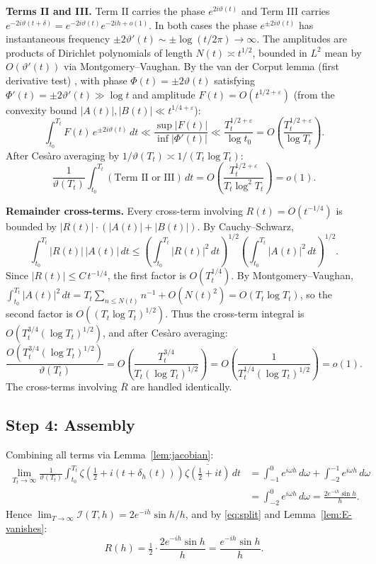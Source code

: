 \documentclass{amsart}
\begin{document}
\medskip
\noindent\textbf{Terms II and III.}\enspace
Term II carries the phase $e^{2i\vartheta(t)}$ and Term III carries
$e^{-2i\vartheta(t+\delta)} = e^{-2i\vartheta(t)}e^{-2ih+o(1)}$.
In both cases the phase $e^{\pm 2i\vartheta(t)}$ has instantaneous frequency
$\pm 2\vartheta'(t) \sim \pm\log(t/2\pi) \to \infty$.
The amplitudes are products of Dirichlet polynomials of length $N(t) \asymp t^{1/2}$,
bounded in $L^2$ mean by $O(\vartheta'(t))$ via Montgomery--Vaughan.
By the van der Corput lemma (first derivative test) \cite{Titchmarsh1986},
with phase $\Phi(t) = \pm 2\vartheta(t)$ satisfying $\Phi'(t) = \pm 2\vartheta'(t)
\gg \log t$ and amplitude $F(t) = O(t^{1/2+\varepsilon})$ (from the convexity
bound $|A(t)|, |B(t)| \ll t^{1/4+\varepsilon}$):
\[
  \int_{t_0}^{T_t} F(t)\,e^{\pm 2i\vartheta(t)}\,dt
  \ll \frac{\sup|F(t)|}{\inf|\Phi'(t)|}
  \ll \frac{T_t^{1/2+\varepsilon}}{\log t_0} = O\!\left(\frac{T_t^{1/2+\varepsilon}}{\log T_t}\right).
\]
After Ces\`aro averaging by $1/\vartheta(T_t) \asymp 1/(T_t\log T_t)$:
\[
  \frac{1}{\vartheta(T_t)}\int_{t_0}^{T_t}(\text{Term II or III})\,dt
  = O\!\left(\frac{T_t^{1/2+\varepsilon}}{T_t\log^2 T_t}\right) = o(1).
\]

\medskip
\noindent\textbf{Remainder cross-terms.}\enspace
Every cross-term involving $R(t) = O(t^{-1/4})$ is bounded by
$|R(t)|\cdot(|A(t)|+|B(t)|)$. By Cauchy--Schwarz,
\[
  \int_{t_0}^{T_t}|R(t)|\,|A(t)|\,dt
  \le \left(\int_{t_0}^{T_t}|R(t)|^2\,dt\right)^{1/2}
      \left(\int_{t_0}^{T_t}|A(t)|^2\,dt\right)^{1/2}.
\]
Since $|R(t)| \le C\,t^{-1/4}$, the first factor is $O(T_t^{1/4})$.
By Montgomery--Vaughan, $\int_{t_0}^{T_t}|A(t)|^2\,dt = T_t\sum_{n\le N(t)}n^{-1}
+ O(N(t)^2) = O(T_t\log T_t)$, so the second factor is $O((T_t\log T_t)^{1/2})$.
Thus the cross-term integral is $O(T_t^{3/4}(\log T_t)^{1/2})$, and after
Ces\`aro averaging:
\[
  \frac{O(T_t^{3/4}(\log T_t)^{1/2})}{\vartheta(T_t)}
  = O\!\left(\frac{T_t^{3/4}}{T_t(\log T_t)^{1/2}}\right)
  = O\!\left(\frac{1}{T_t^{1/4}(\log T_t)^{1/2}}\right) = o(1).
\]
The cross-terms involving $\overline{R}$ are handled identically.

\subsection*{Step 4: Assembly}

Combining all terms via Lemma~\ref{lem:jacobian}:
\begin{align*}
  \lim_{T_t\to\infty}\frac{1}{\vartheta(T_t)}\int_{t_0}^{T_t}
  \zeta\!\left(\tfrac{1}{2}+i(t+\delta_h(t))\right)
  \overline{\zeta\!\left(\tfrac{1}{2}+it\right)}\,dt
  &= \int_{-1}^0 e^{i\omega h}\,d\omega
   + \int_{-2}^{-1} e^{i\omega h}\,d\omega \\
  &= \int_{-2}^0 e^{i\omega h}\,d\omega
   = \frac{2e^{-ih}\sin h}{h}.
\end{align*}
Hence $\lim_{T\to\infty}\mathcal{I}(T,h) = 2e^{-ih}\sin h/h$, and by
\eqref{eq:split} and Lemma~\ref{lem:E-vanishes}:
\[
  R(h) = \tfrac{1}{2}\cdot\frac{2e^{-ih}\sin h}{h} = \frac{e^{-ih}\sin h}{h}.
\]
\end{document}
